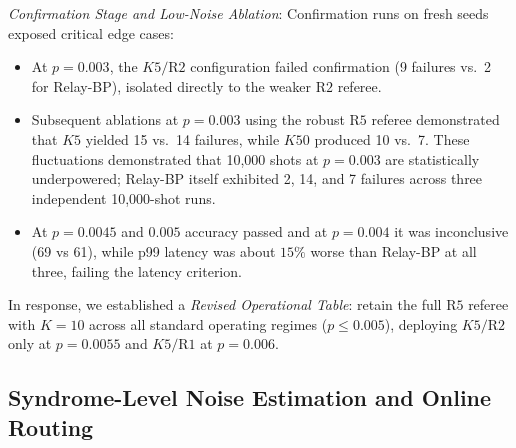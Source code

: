 \textit{Confirmation Stage and Low-Noise Ablation}: Confirmation runs on fresh seeds exposed critical edge cases:
\begin{itemize}
    \item At $p = 0.003$, the $K5/\text{R2}$ configuration failed confirmation (9 failures vs.\ 2 for Relay-BP), isolated directly to the weaker $\text{R2}$ referee.
    \item Subsequent ablations at $p = 0.003$ using the robust $\text{R5}$ referee demonstrated that $K5$ yielded 15 vs.\ 14 failures, while $K50$ produced 10 vs.\ 7. These fluctuations demonstrated that 10,000 shots at $p = 0.003$ are statistically underpowered; Relay-BP itself exhibited 2, 14, and 7 failures across three independent 10,000-shot runs.
    \item At $p = 0.0045$ and $0.005$ accuracy passed and at $p = 0.004$ it was inconclusive (69 vs 61), while p99 latency was about $15\%$ worse than Relay-BP at all three, failing the latency criterion.
\end{itemize}

In response, we established a \textit{Revised Operational Table}: retain the full $\text{R5}$ referee with $K = 10$ across all standard operating regimes ($p \le 0.005$), deploying $K5/\text{R2}$ only at $p = 0.0055$ and $K5/\text{R1}$ at $p = 0.006$.

\subsection{Syndrome-Level Noise Estimation and Online Routing}

